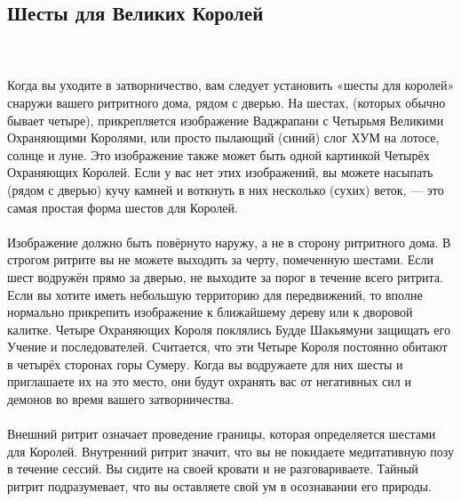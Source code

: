 \subsection{Шесты для Великих Королей}
\\ \\ Когда вы уходите в затворничество, вам следует установить «шесты для королей» снаружи вашего ритритного дома, рядом с дверью. На шестах, (которых обычно бывает четыре), прикрепляется изображение Ваджрапани с Четырьмя Велики\-ми Охраняющими Королями, или просто пылающий (синий) слог ХУМ на лотосе, солнце и луне. Это изображение также может быть одной картинкой Четырёх Охраняющих Королей. Если у вас нет этих изображений, вы можете насыпать (рядом с дверью) кучу камней и воткнуть в них несколько (сухих) веток, — это самая простая форма шестов для Королей.
\\ \\ Изображение должно быть повёрнуто наружу, а не в сторону ритритного дома. В строгом ритрите вы не можете выходить за черту, помеченную шестами. Если шест водружён прямо за дверью, не выходите за порог в течение всего ритрита. Если вы хотите иметь небольшую территорию для передвижений, то вполне нормально прикрепить изображение к ближайшему дереву или к дворовой калитке. Четыре Охраняющих Короля поклялись Будде Шакьямуни защищать его Учение и последователей. Считается, что эти Четыре Короля постоянно обитают в четырёх сторонах горы Сумеру. Когда вы водружаете для них шесты и приглашаете их на это место, они будут охранять вас от негативных сил и демонов во время вашего затворничества.
\\ \\ Внешний ритрит означает проведение границы, которая определяется шестами для Королей. Внутренний ритрит значит, что вы не покидаете медитативную позу в течение сессий. Вы сидите на своей кровати и не разговариваете. Тайный ритрит подразумевает, что вы оставляете свой ум в осознавании его природы.
